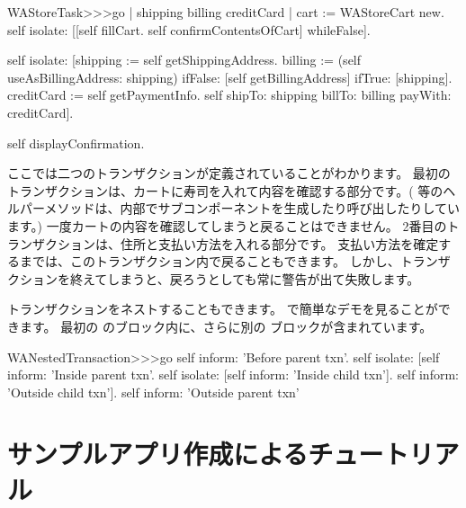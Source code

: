 \documentclass[a4paper,10pt,twoside]{book}
\begin{document}
\begin{code}{}
WAStoreTask>>>go
	| shipping billing creditCard |
	cart := WAStoreCart new.
	self isolate:
		[[self fillCart.
		self confirmContentsOfCart]
			whileFalse].

	self isolate:
		[shipping := self getShippingAddress.
		billing := (self useAsBillingAddress: shipping)
					ifFalse: [self getBillingAddress]
					ifTrue: [shipping].
		creditCard := self getPaymentInfo.
		self shipTo: shipping billTo: billing payWith: creditCard].

	self displayConfirmation.
\end{code}

ここでは二つのトランザクションが定義されていることがわかります。
最初のトランザクションは、カートに寿司を入れて内容を確認する部分です。(  等のヘルパーメソッドは、内部でサブコンポーネントを生成したり呼び出したりしています。)
一度カートの内容を確認してしまうと戻ることはできません。
2番目のトランザクションは、住所と支払い方法を入れる部分です。
支払い方法を確定するまでは、このトランザクション内で戻ることもできます。
しかし、トランザクションを終えてしまうと、戻ろうとしても常に警告が出て失敗します。

トランザクションをネストすることもできます。
で簡単なデモを見ることができます。
最初の のブロック内に、さらに別の ブロックが含まれています。

\begin{code}{}
WANestedTransaction>>>go
	self inform: 'Before parent txn'.
	self isolate:
			[self inform: 'Inside parent txn'.
			self isolate: [self inform: 'Inside child txn'].
			self inform: 'Outside child txn'].
	self inform: 'Outside parent txn'
\end{code}


\section{サンプルアプリ作成によるチュートリアル}
\end{document}
